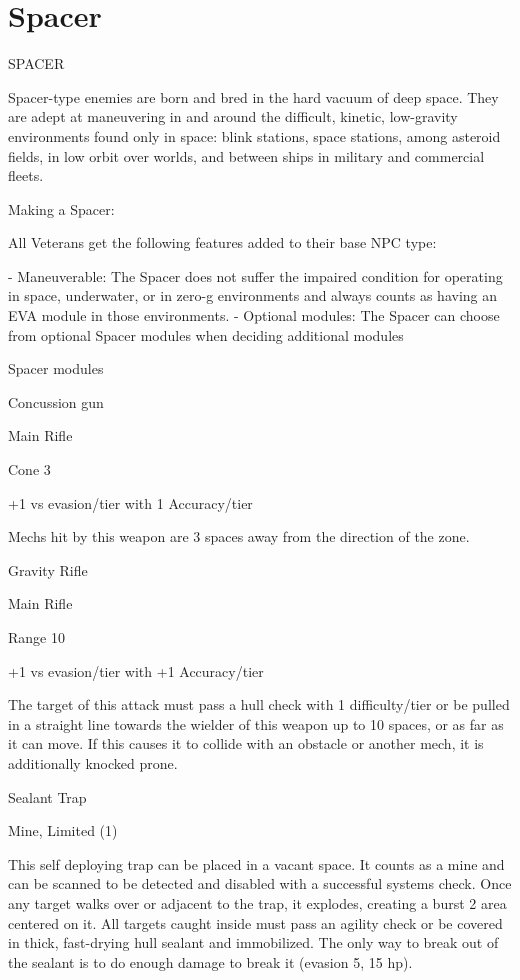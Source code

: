 \section{Spacer}
                                                 SPACER

Spacer-type enemies are born and bred in the hard vacuum of deep space. They are adept at
maneuvering in and around the difficult, kinetic, low-gravity environments found only in space:
blink stations, space stations, among asteroid fields, in low orbit over worlds, and between ships
in military and commercial fleets.

Making a Spacer:

All Veterans get the following features added to their base NPC type:

    -    Maneuverable: The Spacer does not suffer the impaired condition for operating in space,
         underwater, or in zero-g environments and always counts as having an EVA module in
        those environments.
    -   Optional modules: The Spacer can choose from optional Spacer modules when
        deciding additional modules

Spacer modules

Concussion gun





Main Rifle

Cone 3

+1 vs evasion/tier with 1 Accuracy/tier

Mechs hit by this weapon are 3 spaces away from the direction of the zone.


Gravity Rifle

Main Rifle

Range 10

+1 vs evasion/tier with +1 Accuracy/tier

The target of this attack must pass a hull check with 1 difficulty/tier or be pulled in a straight line
towards the wielder of this weapon up to 10 spaces, or as far as it can move. If this causes it to
collide with an obstacle or another mech, it is additionally knocked prone.


Sealant Trap

Mine, Limited (1)

This self deploying trap can be placed in a vacant space. It counts as a mine and can be
scanned to be detected and disabled with a successful systems check. Once any target walks
over or adjacent to the trap, it explodes, creating a burst 2 area centered on it. All targets caught
inside must pass an agility check or be covered in thick, fast-drying hull sealant and immobilized.
The only way to break out of the sealant is to do enough damage to break it (evasion 5, 15 hp).


